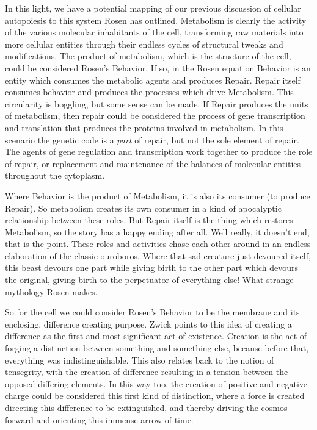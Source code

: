 \documentclass[12pt]{scrartcl}
\begin{document}
In this light, we have a potential mapping of our previous discussion of cellular autopoiesis to this system Rosen has outlined.  Metabolism is clearly the activity of the various molecular inhabitants of the cell, transforming raw materials into more cellular entities through their endless cycles of structural tweaks and modifications.  The product of metabolism, which is the structure of the cell, could be considered Rosen's Behavior.  If so, in the Rosen equation Behavior is an entity which consumes the metabolic agents and produces Repair.  Repair itself consumes behavior and produces the processes which drive Metabolism.  This circularity is boggling, but some sense can be made.  If Repair produces the units of metabolism, then repair could be considered the process of gene transcription and translation that produces the proteins involved in metabolism.  In this scenario the genetic code is a \emph{part} of repair, but not the sole element of repair.  The agents of gene regulation and transcription work together to produce the role of repair, or replacement and maintenance of the balances of molecular entities throughout the cytoplasm.  

Where Behavior is the product of Metabolism, it is also its consumer (to produce Repair).  So metabolism creates its own consumer in a kind of apocalyptic relationship between these roles.  But Repair itself is the thing which restores Metabolism, so the story has a happy ending after all.  Well really, it doesn't end, that is the point.  These roles and activities chase each other around in an endless elaboration of the classic ouroboros.  Where that sad creature just devoured itself, this beast devours one part while giving birth to the other part which devours the original, giving birth to the perpetuator of everything else!  What strange mythology Rosen makes.  

So for the cell we could consider Rosen's Behavior to be the membrane and its enclosing, difference creating purpose.  Zwick points to this idea of creating a difference as the first and most significant act of existence.  \cite{Zwick}  Creation is the act of forging a distinction between something and something else, because before that, everything was indistinguishable.  This also relates back to the notion of tensegrity, with the creation of difference resulting in a tension between the opposed differing elements.  In this way too, the creation of positive and negative charge could be considered this first kind of distinction, where a force is created directing this difference to be extinguished, and thereby driving the cosmos forward and orienting this immense arrow of time.  
\end{document}

